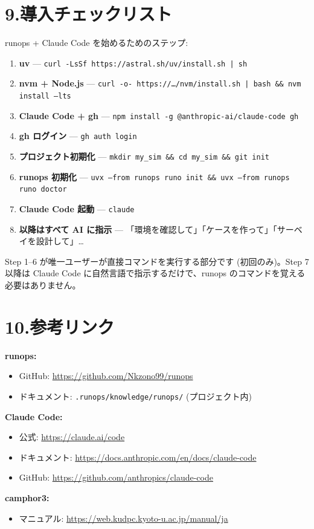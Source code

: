 \documentclass[a4paper,11pt]{article}
\newenvironment{infobox}{%
  \medskip\noindent
  \fboxrule=0.5pt\fboxsep=8pt
  \fcolorbox{infoframe}{infobg}\bgroup\minipage{\dimexpr\linewidth-2\fboxsep-2\fboxrule}
}{%
  \endminipage\egroup\medskip
}
\begin{document}
\section*{\color{darkblue} 9.\quad 導入チェックリスト}

runops + Claude Code を始めるためのステップ:

\begin{enumerate}[nosep]
  \item \textbf{uv} --- \texttt{curl -LsSf https://astral.sh/uv/install.sh | sh}
  \item \textbf{nvm + Node.js} --- \texttt{curl -o- https://\ldots/nvm/install.sh | bash \&\& nvm install --lts}
  \item \textbf{Claude Code + gh} --- \texttt{npm install -g @anthropic-ai/claude-code gh}
  \item \textbf{gh ログイン} --- \texttt{gh auth login}
  \item \textbf{プロジェクト初期化} --- \texttt{mkdir my\_sim \&\& cd my\_sim \&\& git init}
  \item \textbf{runops 初期化} --- \texttt{uvx --from runops runo init \&\& uvx --from runops runo doctor}
  \item \textbf{Claude Code 起動} --- \texttt{claude}
  \item \textbf{以降はすべて AI に指示} --- 「環境を確認して」「ケースを作って」「サーベイを設計して」\ldots{}
\end{enumerate}

\begin{infobox}
Step 1--6 が唯一ユーザーが直接コマンドを実行する部分です (初回のみ)。Step 7 以降は Claude Code に自然言語で指示するだけで、runops のコマンドを覚える必要はありません。
\end{infobox}

\section*{\color{darkblue} 10.\quad 参考リンク}

\textbf{runops:}
\begin{itemize}[nosep]
  \item GitHub: \url{https://github.com/Nkzono99/runops}
  \item ドキュメント: \texttt{.runops/knowledge/runops/} (プロジェクト内)
\end{itemize}

\textbf{Claude Code:}
\begin{itemize}[nosep]
  \item 公式: \url{https://claude.ai/code}
  \item ドキュメント: \url{https://docs.anthropic.com/en/docs/claude-code}
  \item GitHub: \url{https://github.com/anthropics/claude-code}
\end{itemize}

\textbf{camphor3:}
\begin{itemize}[nosep]
  \item マニュアル: \url{https://web.kudpc.kyoto-u.ac.jp/manual/ja}
\end{itemize}
\end{document}
